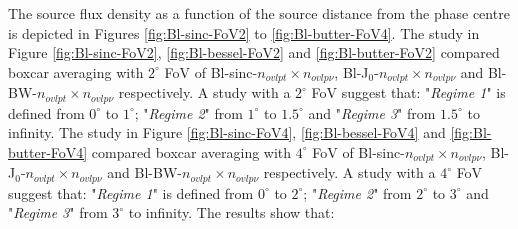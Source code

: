 \documentclass[useAMS,usenatbib]{mn2e}
\begin{document}
The source flux density as a function of the source distance from the phase centre is depicted in Figures \ref{fig:Bl-sinc-FoV2} to 
\ref{fig:Bl-butter-FoV4}.
The study in Figure \ref{fig:Bl-sinc-FoV2}, \ref{fig:Bl-bessel-FoV2} and \ref{fig:Bl-butter-FoV2} 
compared boxcar averaging with $2^{\circ}$ FoV of Bl-sinc-$n_{ovlpt}\times n_{ovlp\nu}$, Bl-J$_0$-$n_{ovlpt}\times n_{ovlp\nu}$ and  
Bl-BW-$n_{ovlpt}\times n_{ovlp\nu}$ respectively. A study with a $2^{\circ}$ FoV suggest that: "\textit{Regime 1}" is defined from 
$0^\circ$ to $1^\circ$; "\textit{Regime 2}" from $1^\circ$ to $1.5^\circ$ and "\textit{Regime 3}" from $1.5^\circ$ to infinity.
The study in Figure \ref{fig:Bl-sinc-FoV4}, \ref{fig:Bl-bessel-FoV4} and \ref{fig:Bl-butter-FoV4} 
compared boxcar averaging with $4^{\circ}$ FoV of Bl-sinc-$n_{ovlpt}\times n_{ovlp\nu}$, Bl-J$_0$-$n_{ovlpt}\times n_{ovlp\nu}$ and  
Bl-BW-$n_{ovlpt}\times n_{ovlp\nu}$ respectively.  A study with a $4^{\circ}$ FoV suggest that: "\textit{Regime 1}" is defined from 
$0^\circ$ 
to $2^\circ$; "\textit{Regime 2}" from $2^\circ$ to $3^\circ$ and "\textit{Regime 3}" from $3^\circ$ to infinity. 
% 
The results show that:
\end{document}
